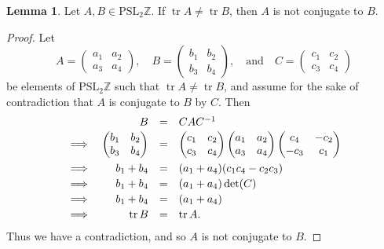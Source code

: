 \documentclass[12pt,twoside]{reedthesis}
\theoremstyle{definition}
\newtheorem{lemma}[thm]{Lemma}
\newcommand{\Z}{\mathbb{Z}}
\newcommand{\PSLZ}{\mathrm{PSL}_2{\Z}}
\DeclareMathOperator{\tr}{tr}
\begin{document}
\begin{lemma}\label{lemma:tr_is_conj_invariant}
  Let $A, B \in \PSLZ$.
  If $\tr A \neq \tr B$, then $A$ is not conjugate to $B$.
\end{lemma}

\begin{proof}
  Let
  \begin{equation*}
    A = \begin{pmatrix}
      a_1 & a_2 \\
      a_3 & a_4
    \end{pmatrix}, \quad B = \begin{pmatrix}
      b_1 & b_2 \\
      b_3 & b_4
    \end{pmatrix}, \quad \text{and} \quad C = \begin{pmatrix}
      c_1 & c_2 \\
      c_3 & c_4
    \end{pmatrix}
  \end{equation*}
  be elements of $\PSLZ$ such that $\tr A \neq \tr B$, and assume for the sake of contradiction that $A$ is conjugate to $B$ by $C$.
  Then
  \begin{equation*}
    \begin{array}{l r c l}
      & B &=& CAC^{-1} \\[0.2em]
      \implies & \begin{pmatrix}
        b_1 & b_2 \\
        b_3 & b_4
      \end{pmatrix} &=&
      \begin{pmatrix}
        c_1 & c_2 \\
        c_3 & c_4
      \end{pmatrix}
      \begin{pmatrix}
        a_1 & a_2 \\
        a_3 & a_4
      \end{pmatrix}
      \begin{pmatrix}
        c_4 & -c_2 \\
        -c_3 & c_1
      \end{pmatrix} \\[1em]
      \implies & b_1 + b_4 &=& (a_1 + a_4)(c_1 c_4 - c_2 c_3) \\[0.2em]
      \implies & b_1 + b_4 &=& (a_1 + a_4)\det(C) \\[0.2em]
      \implies & b_1 + b_4 &=& (a_1 + a_4)\\[0.2em]
      \implies & \tr B &=& \tr A.
    \end{array}
  \end{equation*}
  Thus we have a contradiction, and so $A$ is not conjugate to $B$.
\end{proof}
\end{document}
